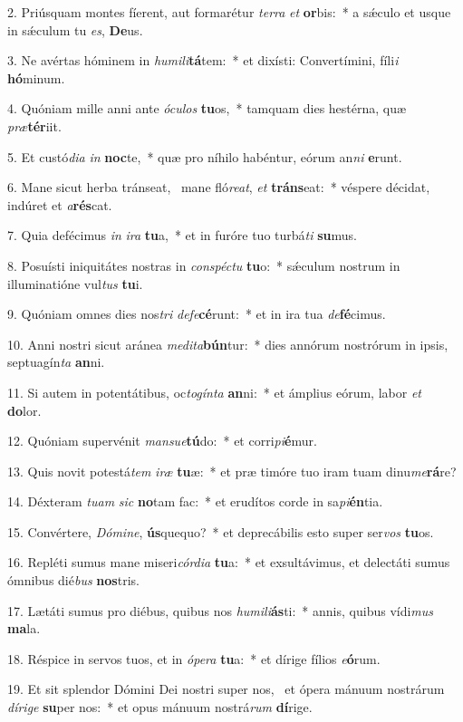 2. Priúsquam montes fíerent, aut formarétur \textit{ter}\textit{ra} \textit{et} \textbf{or}bis:~*  a sǽculo et usque in sǽculum tu \textit{es}, \textbf{De}us.\

3. Ne avértas hóminem in \textit{hu}\textit{mi}\textit{li}\textbf{tá}tem:~*  et dixísti: Convertímini, fíli\textit{i} \textbf{hó}minum.\

4. Quóniam mille anni ante \textit{ó}\textit{cu}\textit{los} \textbf{tu}os,~*  tamquam dies hestérna, quæ \textit{præ}\textbf{tér}iit.\

5. Et custó\textit{di}\textit{a} \textit{in} \textbf{noc}te,~*  quæ pro níhilo habéntur, eórum an\textit{ni} \textbf{e}runt.\

6. Mane sicut herba tránseat, \dag\  mane fló\textit{re}\textit{at}, \textit{et} \textbf{tráns}eat:~*  véspere décidat, indúret et \textit{a}\textbf{rés}cat.\

7. Quia defécimus \textit{in} \textit{i}\textit{ra} \textbf{tu}a,~*  et in furóre tuo turbá\textit{ti} \textbf{su}mus.\

8. Posuísti iniquitátes nostras in \textit{con}\textit{spéc}\textit{tu} \textbf{tu}o:~*  sǽculum nostrum in illuminatióne vul\textit{tus} \textbf{tu}i.\

9. Quóniam omnes dies nos\textit{tri} \textit{de}\textit{fe}\textbf{cé}runt:~*  et in ira tua \textit{de}\textbf{fé}cimus.\

10. Anni nostri sicut aránea \textit{me}\textit{di}\textit{ta}\textbf{bún}tur:~*  dies annórum nostrórum in ipsis, septuagín\textit{ta} \textbf{an}ni.\

11. Si autem in potentátibus, oc\textit{to}\textit{gín}\textit{ta} \textbf{an}ni:~*  et ámplius eórum, labor \textit{et} \textbf{do}lor.\

12. Quóniam supervénit \textit{man}\textit{su}\textit{e}\textbf{tú}do:~*  et corri\textit{pi}\textbf{é}mur.\

13. Quis novit potestá\textit{tem} \textit{i}\textit{ræ} \textbf{tu}æ:~*  et præ timóre tuo iram tuam dinu\textit{me}\textbf{rá}re?\

14. Déxteram \textit{tu}\textit{am} \textit{sic} \textbf{no}tam fac:~*  et erudítos corde in sa\textit{pi}\textbf{én}tia.\

15. Convértere, \textit{Dó}\textit{mi}\textit{ne}, \textbf{ús}quequo?~*  et deprecábilis esto super ser\textit{vos} \textbf{tu}os.\

16. Repléti sumus mane miseri\textit{cór}\textit{di}\textit{a} \textbf{tu}a:~*  et exsultávimus, et delectáti sumus ómnibus dié\textit{bus} \textbf{nos}tris.\

17. Lætáti sumus pro diébus, quibus nos \textit{hu}\textit{mi}\textit{li}\textbf{ás}ti:~*  annis, quibus vídi\textit{mus} \textbf{ma}la.\

18. Réspice in servos tuos, et in \textit{ó}\textit{pe}\textit{ra} \textbf{tu}a:~*  et dírige fílios \textit{e}\textbf{ó}rum.\

19. Et sit splendor Dómini Dei nostri super nos, \dag\  et ópera mánuum nostrárum \textit{dí}\textit{ri}\textit{ge} \textbf{su}per nos:~*  et opus mánuum nostrá\textit{rum} \textbf{dí}rige.\

